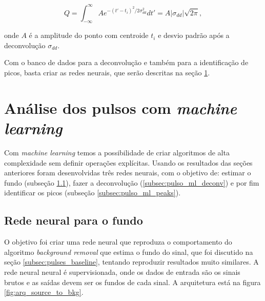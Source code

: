 \documentclass[a4paper,12pt,oneside]{book}
\begin{document}
\begin{equation}\label{eq:gauss_area}
    Q = \int^\infty _{-\infty} Ae^{-(t' - t_i)^2 / 2\sigma_{dd}^2} dt' = A\left |\sigma_{dd} \right|\sqrt{2\pi},
\end{equation}

\par onde $A$ é a amplitude do ponto com centroide $t_i$ e desvio padrão após a deconvolução $\sigma_{dd}$.

\par Com o banco de dados para a deconvolução e também para a identificação de picos, basta criar as redes neurais, que serão descritas na seção \ref{sec:pulsos_ml}.

\section{Análise dos pulsos com \textit{machine learning}}\label{sec:pulsos_ml}


\par Com \textit{machine learning} temos a possibilidade de criar algoritmos de alta complexidade sem definir operações explícitas. Usando os resultados das seções anteriores foram desenvolvidas três redes neurais, com o objetivo de: estimar o fundo (subseção \ref{subsec:pulso_ml_fundo}), fazer a deconvolução (\ref{subsec:pulso_ml_deconv}) e por fim identificar os picos (subseção \ref{subsec:pulso_ml_peaks}). 


\subsection{Rede neural para o fundo}\label{subsec:pulso_ml_fundo}

\par O objetivo foi criar uma rede neural que reproduza o comportamento do algoritmo \textit{background removal} que estima o fundo do sinal, que foi discutido na seção \ref{subsec:pulses_baseline}, tentando reproduzir resultados muito similares. A rede neural neural é supervisionada, onde os dados de entrada são os sinais brutos e as saídas devem ser os fundos de cada sinal. A arquitetura está na figura \ref{fig:arq_source_to_bkg}.

\end{document}
